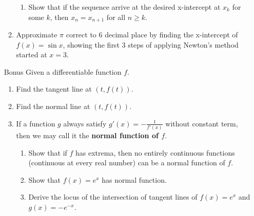 \documentclass[12pt]{article}
\begin{document}
\begin{enumerate}
\begin{enumerate}
\begin{enumerate}
            \item Show that if the sequence arrive at the desired x-intercept at $x_k$ for some $k$, then $x_n=x_{n+1}$ for all $n \geq k$.
        \end{enumerate}
        \item Approximate $\pi$ correct to 6 decimal place by finding the x-intercept of $f(x)=\sin{x}$, showing the first 3 steps of applying Newton's method started at $x=3$.
    \end{enumerate} 
    \item [Bonus] Given a differentiable function $f$.\begin{enumerate}
        \item Find the tangent line at $(t,f(t))$.
        \item Find the normal line at $(t,f(t))$.
        \item If a function $g$ always satisfy $g'(x)=-\frac{1}{f'(x)}$ without constant term, then we may call it the \textbf{normal function of $f$}.\begin{enumerate}
            \item Show that if $f$ has extrema, then no entirely continuous functions (continuous at every real number) can be a normal function of $f$.
            \item Show that $f(x)=e^x$ has normal function.
            \item Derive the locus of the intersection of tangent lines of $f(x)=e^x$ and $g(x)=-e^{-x}$.
        \end{enumerate}
    \end{enumerate}
\end{enumerate}
\end{document}
